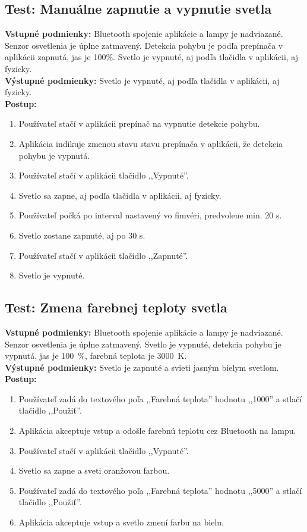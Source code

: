 \documentclass[12pt, a4paper]{article}
\begin{document}
\subsection{Test: Manuálne zapnutie a vypnutie svetla}
\noindent\textbf{Vstupné podmienky:} Bluetooth spojenie aplikácie a lampy je nadviazané. Senzor osvetlenia je úplne zatmavený. Detekcia pohybu je podľa prepínača v aplikácii zapnutá, jas je 100\%. Svetlo je vypnuté, aj podľa tlačidla v aplikácii, aj fyzicky. \\
\textbf{Výstupné podmienky:} Svetlo je vypnuté, aj podľa tlačidla v aplikácii, aj fyzicky. \\
\textbf{Postup:}
\begin{enumerate}
\itemsep0pt
\item Používateľ stačí v aplikácii prepínač na vypnutie detekcie pohybu.
\item Aplikácia indikuje zmenou stavu stavu prepínača v aplikácii, že detekcia pohybu je vypnutá.
\item Používateľ stačí v aplikácii tlačidlo ,,Vypnuté''.
\item Svetlo sa zapne, aj podľa tlačidla v aplikácii, aj fyzicky.
\item Používateľ počká po interval nastavený vo fimvéri, predvolene min. 20 s.
\item Svetlo zostane zapnuté, aj po 30 s.
\item Používateľ stačí v aplikácii tlačidlo ,,Zapnuté''.
\item Svetlo je vypnuté.
\end{enumerate}

\subsection{Test: Zmena farebnej teploty svetla}
\noindent\textbf{Vstupné podmienky:} Bluetooth spojenie aplikácie a lampy je nadviazané. Senzor osvetlenia je úplne zatmavený. Svetlo je vypnuté, detekcia pohybu je vypnutá, jas je 100~\%, farebná teplota je 3000~K. \\
\textbf{Výstupné podmienky:} Svetlo je zapnuté a svieti jasným bielym svetlom. \\
\textbf{Postup:}
\begin{enumerate}
\itemsep0pt
\item Používateľ zadá do textového poľa ,,Farebná teplota'' hodnotu ,,1000'' a stlačí tlačidlo ,,Použiť''.
\item Aplikácia akceptuje vstup a odošle farebnú teplotu cez Bluetooth na lampu.
\item Používateľ stačí v aplikácii tlačidlo ,,Vypnuté''.
\item Svetlo sa zapne a sveti oranžovou farbou.
\item Používateľ zadá do textového poľa ,,Farebná teplota'' hodnotu ,,5000'' a stlačí tlačidlo ,,Použiť''.
\item Aplikácia akceptuje vstup a svetlo zmení farbu na bielu.
\end{enumerate}
\end{document}
